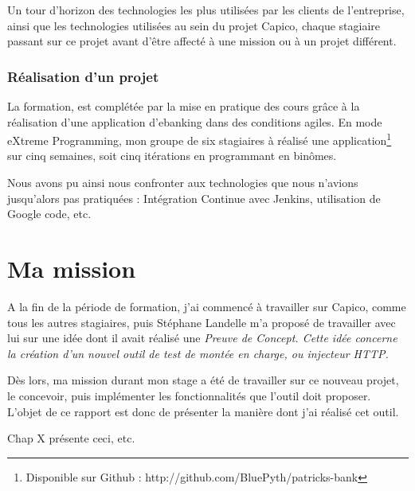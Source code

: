 Un tour d'horizon des technologies les plus utilisées par les clients de l'entreprise, ainsi que les technologies utilisées au sein du projet Capico, chaque stagiaire passant sur ce projet avant d'être affecté à une mission ou à un projet différent.

\subsubsection{Réalisation d'un projet}

La formation, est complétée par la mise en pratique des cours grâce à la réalisation d'une application d'ebanking dans des conditions agiles. En mode eXtreme Programming, mon groupe de six stagiaires à réalisé une application\footnote{Disponible sur Github : http://github.com/BluePyth/patricks-bank} sur cinq semaines, soit cinq itérations en programmant en binômes. 

Nous avons pu ainsi nous confronter aux technologies que nous n'avions jusqu'alors pas pratiquées : Intégration Continue avec Jenkins, utilisation de Google code, etc. 

\section{Ma mission}
A la fin de la période de formation, j'ai commencé à travailler sur Capico, comme tous les autres stagiaires, puis Stéphane Landelle m'a proposé de travailler avec lui sur une idée dont il avait réalisé une \em{Preuve de Concept}. Cette idée concerne la création d'un nouvel outil de test de montée en charge, ou injecteur HTTP.

Dès lors, ma mission durant mon stage a été de travailler sur ce nouveau projet, le concevoir, puis implémenter les fonctionnalités que l'outil doit proposer. L'objet de ce rapport est donc de présenter la manière dont j'ai réalisé cet outil.

Chap X présente ceci, etc.